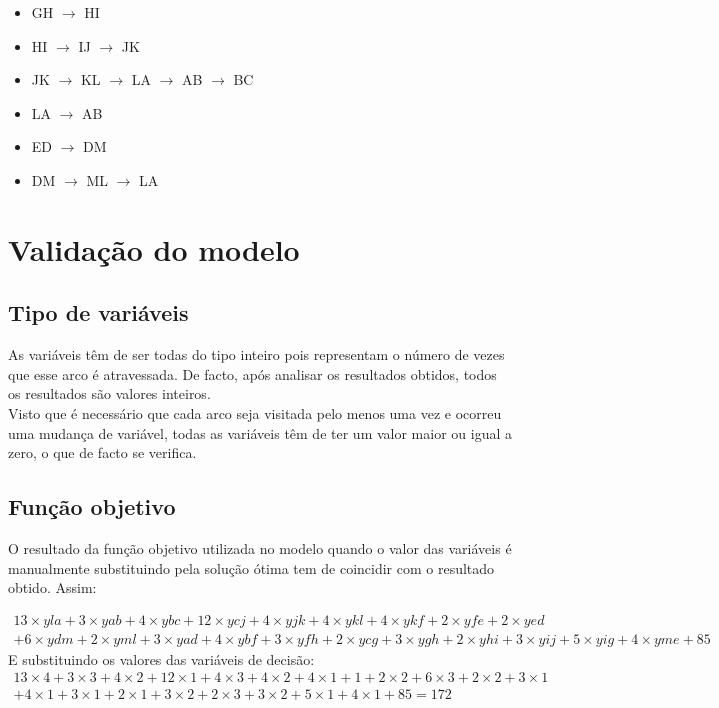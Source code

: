 \documentclass[a4paper]{report}
\begin{document}
\begin{itemize}
        \item GH $\rightarrow$ HI
        \item HI $\rightarrow$ IJ $\rightarrow$ JK
        \item JK $\rightarrow$ KL $\rightarrow$ LA $\rightarrow$ AB $\rightarrow$ BC
        \item LA $\rightarrow$ AB
        \item ED $\rightarrow$ DM
        \item DM $\rightarrow$ ML $\rightarrow$ LA
\end{itemize}

\pagebreak
\section{Validação do modelo}
\subsection{Tipo de variáveis}
As variáveis têm de ser todas do tipo inteiro pois representam o número
de vezes que esse arco é atravessada. De facto, após analisar os resultados
obtidos, todos os resultados são valores inteiros.\\
Visto que é necessário que cada arco seja visitada pelo menos uma
vez e ocorreu uma mudança de variável, todas as variáveis têm de ter um valor
maior ou igual a zero, o que de facto se verifica.

\subsection{Função objetivo}
O resultado da função objetivo utilizada no modelo quando o valor das variáveis
é manualmente substituindo pela solução ótima tem de coincidir com o resultado
obtido. Assim:

\begin{multline}
13\times yla + 3\times yab + 4\times ybc + 12\times ycj + 4\times
yjk + 4\times ykl + 4\times ykf + 2\times yfe + 2\times yed \\ + 6\times ydm +
2\times yml + 3\times yad + 4\times ybf + 3\times yfh + 2\times ycg +
3\times ygh + 2\times yhi + 3\times yij + 5\times yig + 4\times yme + 85
\end{multline}
E substituindo os valores das variáveis de decisão:
\begin{multline}
13\times 4 + 3\times 3 + 4\times 2 + 12\times 1 + 4\times
3 + 4\times 2 + 4\times 1 + 1 + 2\times 2 + 6\times 3 +
2\times 2 + 3\times 1 \\ + 4\times 1 + 3\times 1 + 2\times 1 +
3\times 2 + 2\times 3 + 3\times 2 + 5\times 1 + 4\times 1 + 85
= 172
\end{multline}
\end{document}
